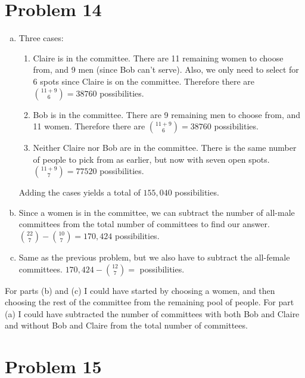 \documentclass[11pt]{article}
\begin{document}
\section*{Problem 14}
\begin{enumerate}[(a)]
	\item
	Three cases:
		\begin{enumerate}[1.]
		\item
		Claire is in the committee. There are 11 remaining women to choose from, and 9 men (since Bob can't serve). Also, we only need to select 		
		for 6 spots since Claire is on the committee. Therefore there are ${11 +9 \choose 6} = 38760$ possibilities.
		
		\item
		Bob is in the committee. There are 9 remaining men to choose from, and 11 women. Therefore there are ${11 +9 \choose 6} = 38760$ 
		possibilities.
		
		\item
		Neither Claire nor Bob are in the committee. There is the same number of people to pick from as earlier, but now with seven open spots. 
		${11+9 \choose 7} = 77520$ possibilities.
		\end{enumerate}
		
	Adding the cases yields a total of $155,040$ possibilities.

	\item
	Since a women is in the committee, we can subtract the number of all-male committees from the total number of committees to find our answer. 
	${22 \choose 7} - {10 \choose 7} = 170,424$ possibilities.
	
	\item
	Same as the previous problem, but we also have to subtract the all-female committees. $170,424- {12 \choose 7} = $ possibilities.
\end{enumerate}

For parts (b) and (c) I could have started by choosing a women, and then choosing the rest of the committee from the remaining pool of people. For part (a) I could have subtracted the number of committees with both Bob and Claire and without Bob and Claire from the total number of committees.


\section*{Problem 15}
\end{document}

